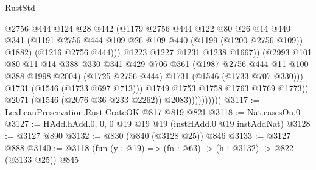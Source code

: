 \begin{lexlean}{RustStd}
\begin{coremodule}
                                    @2756
                                    @444
                                    @124
                                    @28
                                    @442
                                    (@1179
                                      @2756
                                      @444
                                      @122
                                      @80
                                      @26
                                      @14
                                      @440
                                      @341
                                      (@1191
                                        @2756
                                        @444
                                        @109
                                        @26
                                        @109
                                        @440
                                        (@1199 (@1200 @2756 @109))
                                        @1882)
                                      (@1216 @2756 @444)))
                                  @1223
                                  @1227
                                  @1231
                                  @1238
                                  @1667))
                              (@2993
                                @101
                                @80
                                @11
                                @14
                                @388
                                @330
                                @341
                                @429
                                @706
                                @361
                                (@1987 @2756 @444 @11 @100 @388 @1998 @2004)
                                (@1725 @2756 @444)
                                @1731
                                (@1546 (@1733 @707 @330)))
                              @1731
                              (@1546 (@1733 @697 @713)))
                            @1749
                            @1753
                            @1758
                            @1763
                            @1769
                            @1773))
                        @2071
                        (@1546 (@2076 @36 @233 @2262))
                        @2083))))))))))
@3117 := LexLeanPreservation.Rust.CrateOK @817 @819 @821
@3118 := Nat.casesOn.{0}
@3127 := HAdd.hAdd.{0, 0, 0} @19 @19 @19 (instHAdd.{0} @19 instAddNat)
@3128 := @3127 @890
@3132 := @830 (@840 (@3128 @25)) @846
@3133 := @3127 @888
@3140 := @3118 (fun (y : @19) => (fn : @63) -> (h : @3132) -> @822 (@3133 @25)) @845

\end{coremodule}
\end{lexlean}
